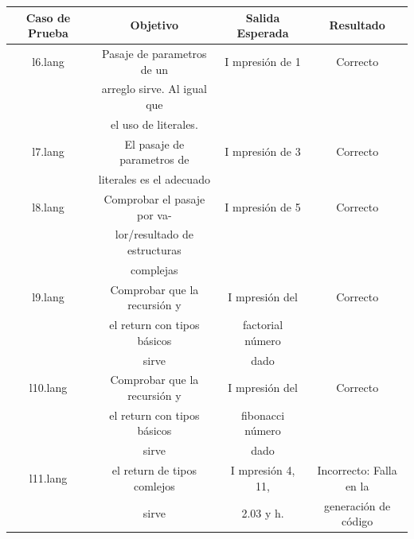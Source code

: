 \documentclass[11pt, spanish]{report}
\begin{document}
\begin{itemize}
  \newpage

  \begin{table}[!hbp]
    \begin{tabular}{c c c c}
      \hline            
      \hline            
      Caso de Prueba & Objetivo                       & Salida Esperada      & Resultado \\ [0.5ex]
      \hline                          
      l6.lang        & Pasaje de parametros de un     & I mpresi\'on de 1    & Correcto  \\ [1ex] 
                     & arreglo sirve. Al igual que    &                      &           \\ [1ex] 
                     & el uso de literales.           &                      &           \\ [1ex] 
      l7.lang        & El pasaje de parametros de     & I mpresi\'on de 3    & Correcto  \\ [1ex] 
                     & literales es el adecuado       &                      &           \\ [1ex] 
      l8.lang        & Comprobar el pasaje por va-    & I mpresi\'on de 5    & Correcto  \\ [1ex] 
                     & lor/resultado de estructuras   &                      &           \\ [1ex] 
                     & complejas                      &                      &           \\ [1ex] 
      l9.lang        & Comprobar que la recursión y   & I mpresi\'on del     & Correcto  \\ [1ex] 
                     & el return con tipos básicos    & factorial n\'umero   &           \\ [1ex] 
                     & sirve                          & dado                 &           \\ [1ex] 
      l10.lang       & Comprobar que la recursión y   & I mpresi\'on del     & Correcto  \\ [1ex] 
                     & el return con tipos básicos    & fibonacci n\'umero   &           \\ [1ex] 
                     & sirve                          & dado                 &           \\ [1ex] 
      l11.lang       & el return de tipos comlejos    & I mpresi\'on  4, 11, & Incorrecto: Falla en la  \\ [1ex] 
                     & sirve                          & 2.03 y h.            & generaci\'on de c\'odigo  \\ [1ex] 
      \hline
    \end{tabular}    
  \end{table}


\end{itemize}
\end{document}
